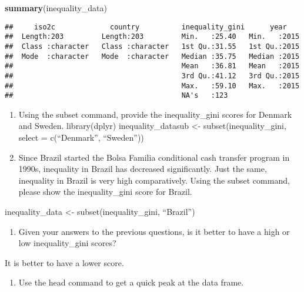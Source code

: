 \documentclass[
]{article}
\newenvironment{Shaded}{\begin{snugshade}}{\end{snugshade}}
\newcommand{\KeywordTok}[1]{\textcolor[rgb]{0.13,0.29,0.53}{\textbf{#1}}}
\newcommand{\NormalTok}[1]{#1}
\providecommand{\tightlist}{%
  \setlength{\itemsep}{0pt}\setlength{\parskip}{0pt}}
\begin{document}
\begin{Shaded}
\begin{Highlighting}[]
\KeywordTok{summary}\NormalTok{(inequality_data)}
\end{Highlighting}
\end{Shaded}

\begin{verbatim}
##     iso2c             country          inequality_gini      year     
##  Length:203         Length:203         Min.   :25.40   Min.   :2015  
##  Class :character   Class :character   1st Qu.:31.55   1st Qu.:2015  
##  Mode  :character   Mode  :character   Median :35.75   Median :2015  
##                                        Mean   :36.81   Mean   :2015  
##                                        3rd Qu.:41.12   3rd Qu.:2015  
##                                        Max.   :59.10   Max.   :2015  
##                                        NA's   :123
\end{verbatim}

\begin{enumerate}
\def\labelenumi{\arabic{enumi}.}
\setcounter{enumi}{3}
\item
  Using the subset command, provide the inequality\_gini scores for
  Denmark and Sweden. library(dplyr) inequality\_datasub \textless-
  subset(inequality\_gini, select = c(``Denmark'', ``Sweden''))
\item
  Since Brazil started the Bolsa Familia conditional cash transfer
  program in 1990s, inequality in Brazil has decreased significantly.
  Just the same, inequality in Brazil is very high comparatively. Using
  the subset command, please show the inequality\_gini score for Brazil.
\end{enumerate}

inequality\_data \textless- subset(inequality\_gini, ``Brazil'')

\begin{enumerate}
\def\labelenumi{\arabic{enumi}.}
\setcounter{enumi}{5}
\tightlist
\item
  Given your answers to the previous questions, is it better to have a
  high or low inequality\_gini scores?
\end{enumerate}

It is better to have a lower score.

\begin{enumerate}
\def\labelenumi{\arabic{enumi}.}
\setcounter{enumi}{6}
\tightlist
\item
  Use the head command to get a quick peak at the data frame.
\end{enumerate}
\end{document}
